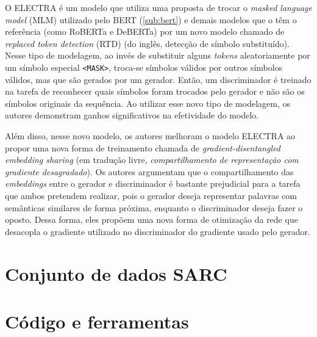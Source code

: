 O ELECTRA é um modelo que utiliza uma proposta de trocar o \textit{masked
language model} (MLM) utilizado pelo BERT (\ref{sub:bert}) e demais modelos que
o têm o referência (como RoBERTa e DeBERTa) por um novo modelo chamado de
\textit{replaced token detection} (RTD) (do inglês, detecção de símbolo
substituído). Nesse tipo de modelagem, ao invés de substituir alguns
\textit{tokens} aleatoriamente por um símbolo especial \texttt{<MASK>}, troca-se
símbolos válidos por outros símbolos válidos, mas que são gerados por um
gerador. Então, um discriminador é treinado na tarefa de reconhecer quais
símbolos foram trocados pelo gerador e não são os símbolos originais da
sequência. Ao utilizar esse novo tipo de modelagem, os autores demonstram ganhos
significativos na efetividade do modelo.

Além disso, nesse novo modelo, os autores melhoram o modelo ELECTRA ao propor
uma nova forma de treinamento chamada de \textit{gradient-disentangled embedding
sharing} (em tradução livre, \textit{compartilhamento de representação com
gradiente desagradado}). Os autores argumentam que o compartilhamento das
\textit{embeddings} entre o gerador e discriminador é bastante prejudicial para
a tarefa que ambos pretendem realizar, pois o gerador deseja representar
palavras com semânticas similares de forma próxima, enquanto o discriminador
deseja fazer o oposto. Dessa forma, eles propõem uma nova forma de otimização da
rede que desacopla o gradiente utilizado no discriminador do gradiente usado
pelo gerador.

\section{Conjunto de dados SARC}%
\label{sec:conjunto_de_dados_sarc}

\section{Código e ferramentas}%
\label{sec:codigo_e_ferramentas}



